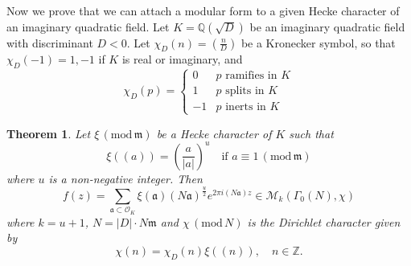 \documentclass{article}
\newtheorem{theorem}{Theorem}
\newcommand{\Mod}[1]{\,(\mathrm{mod}\,#1)}
\begin{document}
Now we prove that we can attach a modular form to a given Hecke character of an imaginary quadratic field. Let $K = \mathbb{Q}(\sqrt{D})$ be an imaginary quadratic field with discriminant $D<0$. 
Let $\chi_{D}(n) = \left(\frac{n}{D}\right)$ be a Kronecker symbol, so that $\chi_{D}(-1) = 1, -1$ if $K$ is real or imaginary, and 
$$
\chi_{D}(p) = \begin{cases} 0 & p\text{ ramifies in $K$} \\ 1 & p\text{ splits in $K$} \\ -1 & p\text{ inerts in $K$} \end{cases}
$$
\begin{theorem}
Let $\xi\Mod{\mathfrak{m}}$ be a Hecke character of $K$ such that 
$$
\xi((a)) = \left(\frac{a}{|a|}\right)^{u} \quad \text{if }a\equiv 1\Mod{\mathfrak{m}}
$$
where $u$ is a non-negative integer. Then 
$$
f(z) = \sum_{\mathfrak{a}\subset \mathcal{O}_{K}}\xi(\mathfrak{a}) (N\mathfrak{a})^{\frac{u}{2}}e^{2\pi i (N\mathfrak{a})z} \in \mathcal{M}_{k}(\Gamma_{0}(N), \chi)
$$
where $k = u+1$, $N = |D|\cdot N\mathfrak{m}$ and $\chi\Mod{N}$ is the Dirichlet character given by $$\chi(n) = \chi_{D}(n)\xi((n)), \quad n\in \mathbb{Z}. $$
\end{theorem}
\end{document}
